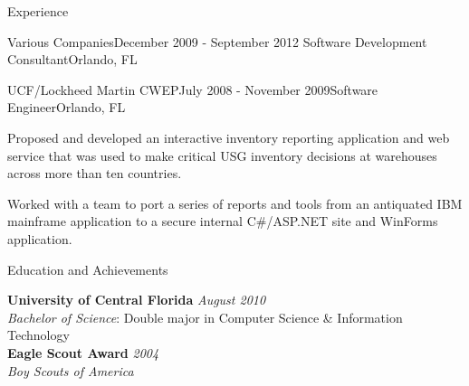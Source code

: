 \documentclass{resume} %
\begin{document}
\begin{rSection}{Experience}
\begin{rSubsection}{Various Companies}{December 2009 - September 2012}{ Software Development Consultant}{Orlando, FL}
\end{rSubsection}


\begin{rSubsection}{UCF/Lockheed Martin CWEP}{July 2008 - November 2009}{Software Engineer}{Orlando, FL}

\item Proposed and developed an interactive inventory reporting application and  web service that was used to make critical USG inventory decisions at warehouses across more than ten countries.
\item Worked with a team to port a series of reports and tools from an antiquated IBM mainframe application to a secure internal C\#/ASP.NET site and WinForms application.

\end{rSubsection}


\end{rSection}


\begin{rSection}{Education and Achievements}

{\bf University of Central Florida} \hfill {\em August 2010} \\ 
\textit{Bachelor of Science}: Double major in Computer Science \& Information Technology \\
{\bf Eagle Scout Award} \hfill {\em 2004} \\ 
\textit{Boy Scouts of America} \\
\end{rSection}





\end{document}

